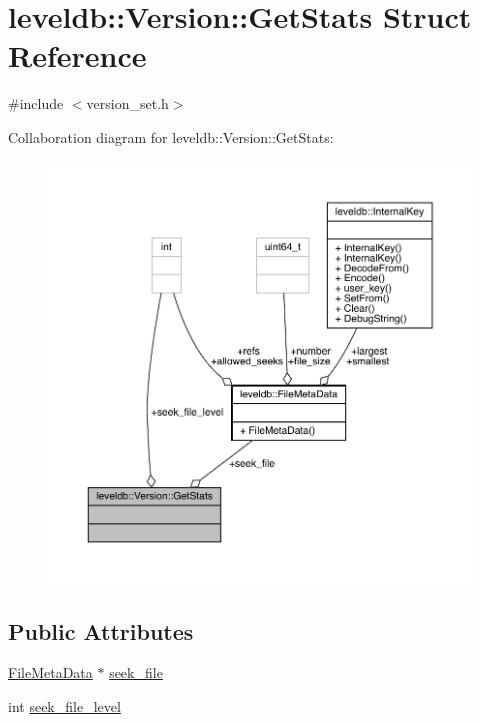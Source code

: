 \hypertarget{structleveldb_1_1_version_1_1_get_stats}{}\section{leveldb\+::Version\+::Get\+Stats Struct Reference}
\label{structleveldb_1_1_version_1_1_get_stats}


{\ttfamily \#include $<$version\+\_\+set.\+h$>$}



Collaboration diagram for leveldb\+::Version\+::Get\+Stats\+:
\nopagebreak
\begin{figure}[H]
\begin{center}
\leavevmode
\includegraphics[width=350pt]{structleveldb_1_1_version_1_1_get_stats__coll__graph}
\end{center}
\end{figure}
\subsection*{Public Attributes}
\begin{DoxyCompactItemize}
\item 
\mbox{\hyperlink{structleveldb_1_1_file_meta_data}{File\+Meta\+Data}} $\ast$ \mbox{\hyperlink{structleveldb_1_1_version_1_1_get_stats_a8c677e9a2d5bc48a5bcc40e07dd2cca7}{seek\+\_\+file}}
\item 
int \mbox{\hyperlink{structleveldb_1_1_version_1_1_get_stats_a6cd952d5850faf00c7d45f79973a76d4}{seek\+\_\+file\+\_\+level}}
\end{DoxyCompactItemize}


